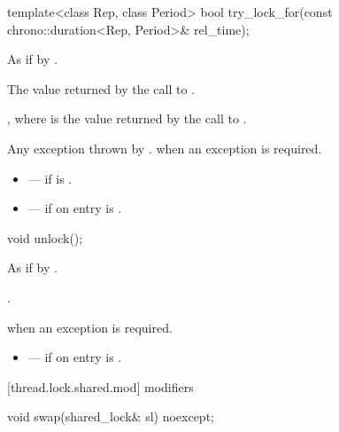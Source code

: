%
\begin{itemdecl}
template<class Rep, class Period>
  bool try_lock_for(const chrono::duration<Rep, Period>& rel_time);
\end{itemdecl}

\begin{itemdescr}
\pnum
\effects As if by .

\pnum
\returns The value returned by the call to .

\pnum
\postconditions {}, where  is the value returned by the call to .

\pnum
\throws Any exception thrown by .  when an exception is required.

\pnum
\errors
\begin{itemize}
\item {} --- if  is .
\item {} --- if on entry  is
.
\end{itemize}
\end{itemdescr}

%
\begin{itemdecl}
void unlock();
\end{itemdecl}

\begin{itemdescr}
\pnum
\effects As if by .

\pnum
\postconditions {}.

\pnum
\throws {} when an exception is required.

\pnum
\errors
\begin{itemize}
\item {} --- if on entry  is
.
\end{itemize}
\end{itemdescr}

[thread.lock.shared.mod]{ modifiers}

%
\begin{itemdecl}
void swap(shared_lock& sl) noexcept;
\end{itemdecl}

